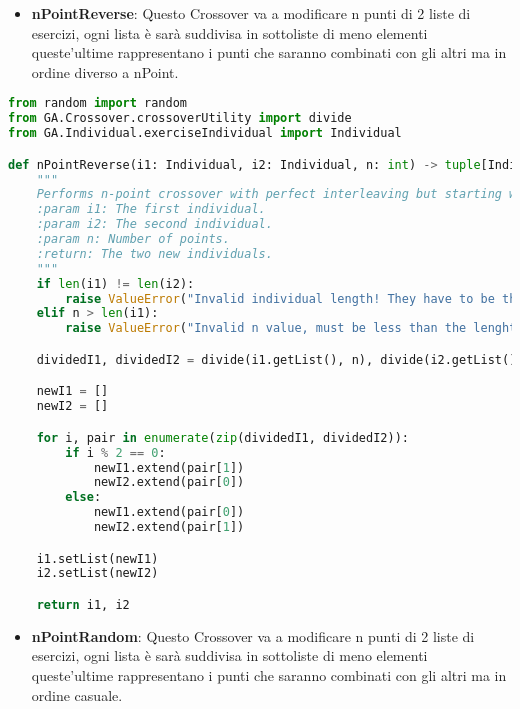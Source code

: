 \documentclass{article}
\begin{document}
\begin{itemize}
\item\textbf{nPointReverse}: Questo Crossover va a modificare n punti di 2 liste di esercizi, ogni lista è sarà suddivisa in sottoliste di meno elementi queste'ultime rappresentano i punti che saranno combinati con gli altri ma in ordine diverso a nPoint.
\end{itemize}
\begin{lstlisting}[language=Python, breaklines, no caption]
from random import random
from GA.Crossover.crossoverUtility import divide
from GA.Individual.exerciseIndividual import Individual

def nPointReverse(i1: Individual, i2: Individual, n: int) -> tuple[Individual, Individual]:
    """
    Performs n-point crossover with perfect interleaving but starting with a switch.
    :param i1: The first individual.
    :param i2: The second individual.
    :param n: Number of points.
    :return: The two new individuals.
    """
    if len(i1) != len(i2):
        raise ValueError("Invalid individual length! They have to be the same.")
    elif n > len(i1):
        raise ValueError("Invalid n value, must be less than the lenght of the individual!")

    dividedI1, dividedI2 = divide(i1.getList(), n), divide(i2.getList(), n)

    newI1 = []
    newI2 = []

    for i, pair in enumerate(zip(dividedI1, dividedI2)):
        if i % 2 == 0:
            newI1.extend(pair[1])
            newI2.extend(pair[0])
        else:
            newI1.extend(pair[0])
            newI2.extend(pair[1])

    i1.setList(newI1)
    i2.setList(newI2)

    return i1, i2
\end{lstlisting}
\begin{itemize}
\item\textbf{nPointRandom}: Questo Crossover va a modificare n punti di 2 liste di esercizi, ogni lista è sarà suddivisa in sottoliste di meno elementi queste'ultime rappresentano i punti che saranno combinati con gli altri ma in ordine casuale.
\end{itemize}
\end{document}
